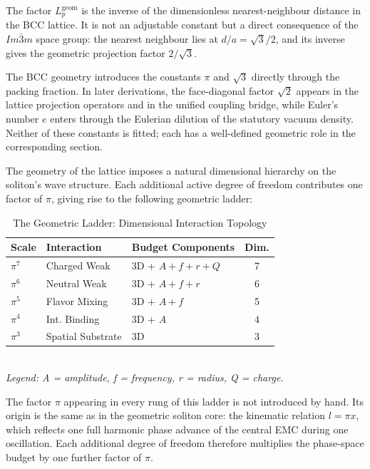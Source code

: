 \documentclass[10pt,a4paper]{article}
\begin{document}
The factor \(L_p^{\text{geom}}\) is the inverse of the dimensionless nearest-neighbour distance in the BCC lattice. It is not an adjustable constant but a direct consequence of the \(Im\bar{3}m\) space group: the nearest neighbour lies at \(d/a = \sqrt{3}/2\), and its inverse gives the geometric projection factor \(2/\sqrt{3}\).

The BCC geometry introduces the constants \(\pi\) and \(\sqrt{3}\) directly through the packing fraction. In later derivations, the face-diagonal factor \(\sqrt{2}\) appears in the lattice projection operators and in the unified coupling bridge, while Euler's number \(e\) enters through the Eulerian dilution of the statutory vacuum density. Neither of these constants is fitted; each has a well-defined geometric role in the corresponding section.

The geometry of the lattice imposes a natural dimensional hierarchy on the soliton's wave structure. Each additional active degree of freedom contributes one factor of \(\pi\), giving rise to the following geometric ladder:

\begin{table}[h]
	\centering
	\small
	\caption{The Geometric Ladder: Dimensional Interaction Topology}
	\label{tab:dimensional_ladder_origin}
	\begin{tabular}{l l l c}
		\toprule
		\textbf{Scale} & \textbf{Interaction} & \textbf{Budget Components} & \textbf{Dim.} \\
		\midrule
		$\pi^7$ & Charged Weak & 3D + $A + f + r + Q$ & 7 \\
		$\pi^6$ & Neutral Weak & 3D + $A + f + r$     & 6 \\
		$\pi^5$ & Flavor Mixing & 3D + $A + f$         & 5 \\
		$\pi^4$ & Int. Binding  & 3D + $A$              & 4 \\
		$\pi^3$ & Spatial Substrate & 3D & 3 \\
		\bottomrule
	\end{tabular}\\[4pt]
	\textit{Legend: A = amplitude, f = frequency, r = radius, Q = charge.}
\end{table}

The factor \(\pi\) appearing in every rung of this ladder is not introduced by hand. Its origin is the same as in the geometric soliton core: the kinematic relation \(l = \pi x\), which reflects one full harmonic phase advance of the central EMC during one oscillation. Each additional degree of freedom therefore multiplies the phase-space budget by one further factor of \(\pi\).
\end{document}
